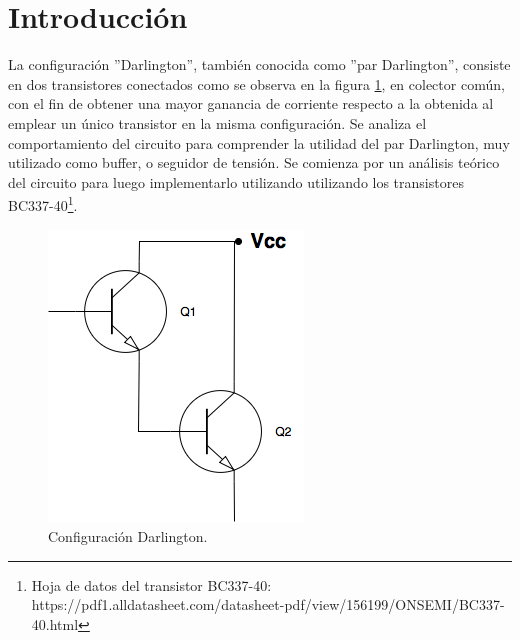 \section{Introducci\'on}

La configuraci\'on ''Darlington'', tambi\'en conocida como ''par Darlington'', consiste en dos transistores conectados como se observa en la figura \ref{darlington_ideal}, en colector común, con el fin de obtener una mayor ganancia de corriente respecto a la obtenida al emplear un \'unico transistor en la misma configuración. Se analiza el comportamiento del circuito para comprender la utilidad del par Darlington, muy utilizado como buffer, o seguidor de tensión. Se comienza por un an\'alisis te\'orico del circuito para luego implementarlo utilizando utilizando los transistores BC337-40\footnote{Hoja de datos del transistor BC337-40: https://pdf1.alldatasheet.com/datasheet-pdf/view/156199/ONSEMI/BC337-40.html}.

\begin{figure}[H]
	\centering
		\includegraphics[scale=0.4]{./Imagenes/darlington_ideal.png} 
	\caption{Configuraci\'on Darlington.}
	\label{darlington_ideal}
\end{figure}
